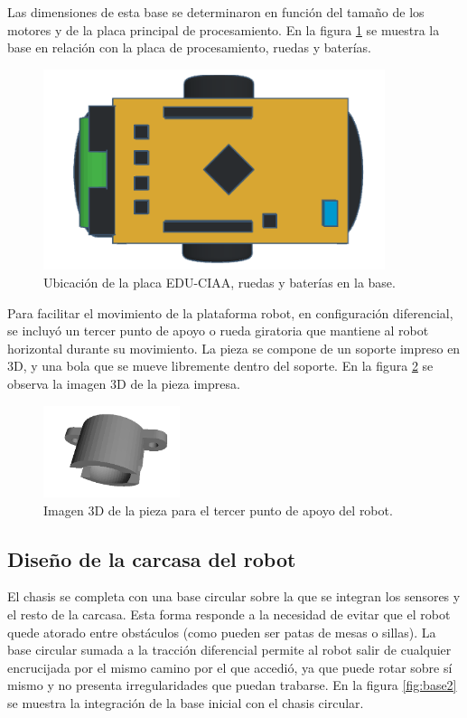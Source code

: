 Las dimensiones de esta base se determinaron en función del tamaño de los motores y de la placa principal de procesamiento. En la figura \ref{fig:baseeduciaa} se muestra la base en relación con la placa de procesamiento, ruedas y baterías. 

\begin{figure}[h]
	\centering
	\includegraphics[width=10cm]{./Figures/baseeduciaa.png}
	\caption{Ubicación de la placa EDU-CIAA, ruedas y baterías en la base.}
	\label{fig:baseeduciaa}
\end{figure}

Para facilitar el movimiento de la plataforma robot, en configuración diferencial, se incluyó un tercer punto de apoyo o  rueda giratoria que mantiene al robot horizontal durante su movimiento. La pieza se compone de un soporte impreso en 3D, y una bola que se mueve libremente dentro del soporte. En la figura \ref{fig:ballcater} se observa la imagen 3D de la pieza impresa.


\begin{figure}[h]
	\centering
	\includegraphics[width=4cm]{./Figures/ballcater.PNG}
	\caption{Imagen 3D de la pieza para el tercer punto de apoyo del robot.}
	\label{fig:ballcater}
\end{figure}


\subsection{Diseño de la carcasa del robot}

El chasis se completa con una base circular sobre la que se integran los sensores y el resto de la carcasa. Esta forma responde a la necesidad de evitar que el robot quede atorado entre obstáculos (como pueden ser patas de mesas o sillas). La base circular sumada a la tracción diferencial permite al robot salir de cualquier encrucijada por el mismo camino por el que accedió, ya que puede rotar sobre sí mismo y no presenta irregularidades que puedan trabarse. En la figura \ref{fig:base2} se muestra la integración de la base inicial con el chasis circular. 

